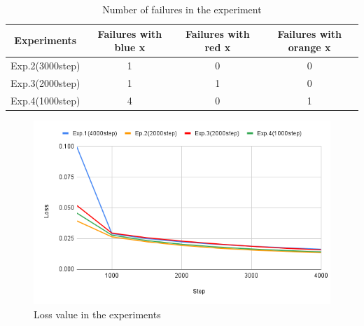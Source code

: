\begin{table}[h]
  \centering
  \begin{tabular}{|c|c|c|c|} \hline
    Experiments & Failures with blue x & Failures with red x & Failures with orange x\\ \hline
    Exp.2(3000step) & 1 & 0 & 0 \\ \hline
    Exp.3(2000step) & 1 & 1 & 0 \\ \hline
    Exp.4(1000step) & 4 & 0 & 1 \\ \hline
  \end{tabular}
  \caption{Number of failures in the experiment}
  \label{tb:fail3}
\end{table}

\begin{figure}[h]
  \centering
  \includegraphics[keepaspectratio, scale=0.5]{images/loss3.png}
  \caption{Loss value in the experiments}
  \label{Fig:loss3}
  \end{figure}